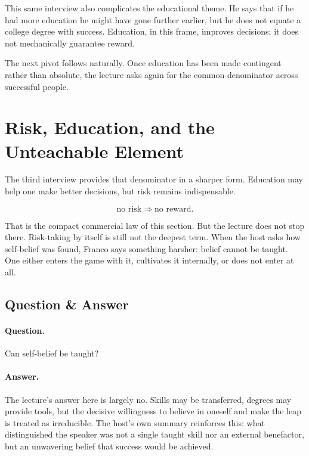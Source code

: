 This same interview also complicates the educational theme. He says that if he had more education he might have gone further earlier, but he does not equate a college degree with success. Education, in this frame, improves decisions; it does not mechanically guarantee reward.

The next pivot follows naturally. Once education has been made contingent rather than absolute, the lecture asks again for the common denominator across successful people.

\section{Risk, Education, and the Unteachable Element}

The third interview provides that denominator in a sharper form. Education may help one make better decisions, but risk remains indispensable.

\begin{equation}
\text{no risk} \Rightarrow \text{no reward}.
\end{equation}

That is the compact commercial law of this section. But the lecture does not stop there. Risk-taking by itself is still not the deepest term. When the host asks how self-belief was found, Franco says something harsher: belief cannot be taught. One either enters the game with it, cultivates it internally, or does not enter at all.

\subsection{Question \& Answer}

\paragraph{Question.}
Can self-belief be taught?

\paragraph{Answer.}
The lecture's answer here is largely no. Skills may be transferred, degrees may provide tools, but the decisive willingness to believe in oneself and make the leap is treated as irreducible. The host's own summary reinforces this: what distinguished the speaker was not a single taught skill nor an external benefactor, but an unwavering belief that success would be achieved.

